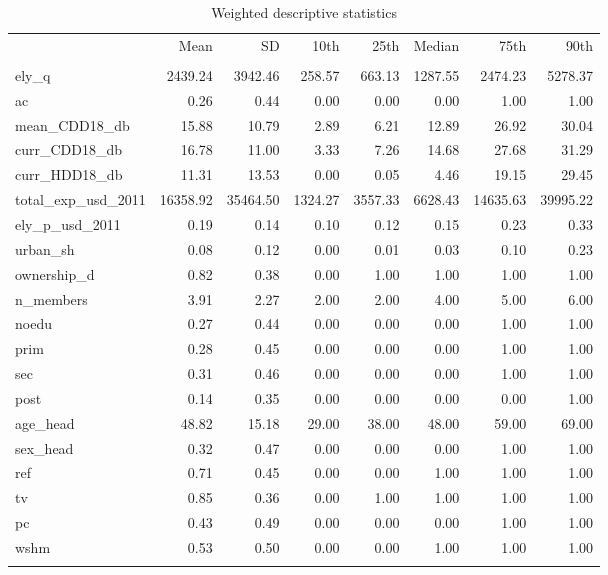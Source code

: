 \begin{table}[htp]
\setlength{\tabcolsep}{10pt}
\renewcommand{\arraystretch}{1.3}
\centering
\caption{Weighted descriptive statistics} 
\label{table2}
\begingroup\fontsize{9pt}{10pt}\selectfont
\begin{tabular}{lrrrrrrr}
  \hline
\addlinespace
  & Mean & SD & 10th & 25th & Median & 75th & 90th \\
\addlinespace
 \hline
  \addlinespace
\multicolumn{8}{l}{\textbf{\textit{Global}}} \\
\addlinespace
ely_q & 2439.24 & 3942.46 & 258.57 & 663.13 & 1287.55 & 2474.23 & 5278.37 \\ 
  ac & 0.26 & 0.44 & 0.00 & 0.00 & 0.00 & 1.00 & 1.00 \\ 
  mean_CDD18_db & 15.88 & 10.79 & 2.89 & 6.21 & 12.89 & 26.92 & 30.04 \\ 
  curr_CDD18_db & 16.78 & 11.00 & 3.33 & 7.26 & 14.68 & 27.68 & 31.29 \\ 
  curr_HDD18_db & 11.31 & 13.53 & 0.00 & 0.05 & 4.46 & 19.15 & 29.45 \\ 
  total_exp_usd_2011 & 16358.92 & 35464.50 & 1324.27 & 3557.33 & 6628.43 & 14635.63 & 39995.22 \\ 
  ely_p_usd_2011 & 0.19 & 0.14 & 0.10 & 0.12 & 0.15 & 0.23 & 0.33 \\ 
  urban_sh & 0.08 & 0.12 & 0.00 & 0.01 & 0.03 & 0.10 & 0.23 \\ 
  ownership_d & 0.82 & 0.38 & 0.00 & 1.00 & 1.00 & 1.00 & 1.00 \\ 
  n_members & 3.91 & 2.27 & 2.00 & 2.00 & 4.00 & 5.00 & 6.00 \\ 
  noedu & 0.27 & 0.44 & 0.00 & 0.00 & 0.00 & 1.00 & 1.00 \\ 
  prim & 0.28 & 0.45 & 0.00 & 0.00 & 0.00 & 1.00 & 1.00 \\ 
  sec & 0.31 & 0.46 & 0.00 & 0.00 & 0.00 & 1.00 & 1.00 \\ 
  post & 0.14 & 0.35 & 0.00 & 0.00 & 0.00 & 0.00 & 1.00 \\ 
  age_head & 48.82 & 15.18 & 29.00 & 38.00 & 48.00 & 59.00 & 69.00 \\ 
  sex_head & 0.32 & 0.47 & 0.00 & 0.00 & 0.00 & 1.00 & 1.00 \\ 
  ref & 0.71 & 0.45 & 0.00 & 0.00 & 1.00 & 1.00 & 1.00 \\ 
  tv & 0.85 & 0.36 & 0.00 & 1.00 & 1.00 & 1.00 & 1.00 \\ 
  pc & 0.43 & 0.49 & 0.00 & 0.00 & 0.00 & 1.00 & 1.00 \\ 
  wshm & 0.53 & 0.50 & 0.00 & 0.00 & 1.00 & 1.00 & 1.00 \\ 
   \addlinespace
\hline
\addlinespace
\end{tabular}
\endgroup
\end{table}
